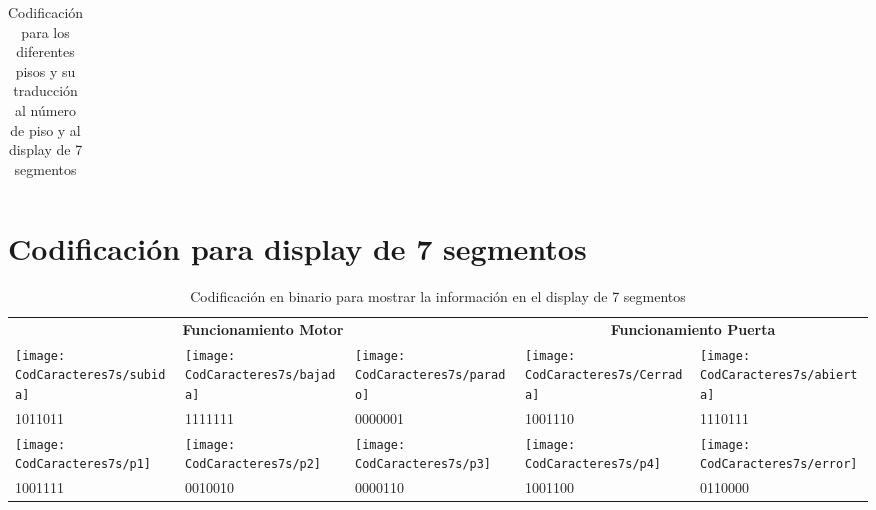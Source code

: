 \begin{appendices}
\begin{table}[H]
\begin{tabular}{|c|c|}
			\end{tabular}
			\caption{ Codificación para los diferentes pisos y su traducción  al número de piso y al display de 7 segmentos }
			\label{tab:tabla2ApendiceA}
		\end{table}
		
	\section{Codificación para display de 7 segmentos}	\label{app:7segmentos}
		\begin{table}[H]
        \centering
			\begin{tabular}{| p{1/4\textwidth}| p{}  | p{1/4\textwidth}|| p{}| p{}|}
				\hline
				\rowcolor[rgb]{0.21,0.69,0.87}\multicolumn{5}{|c|}{  \textbf{ {Caracteres en binario para display de 7 segmentos}}} \\
				\hline \hline
				\multicolumn{3}{|c|}{  \textbf{ {Funcionamiento Motor}}} & \multicolumn{2}{|c|}{\textbf{Funcionamiento Puerta}} \\
				\hline
				 \texttt{[image: CodCaracteres7s/subida]} &
				 \texttt{[image: CodCaracteres7s/bajada]}  &
				 \texttt{[image: CodCaracteres7s/parado]} &
				 \texttt{[image: CodCaracteres7s/Cerrada]}  &
				 \texttt{[image: CodCaracteres7s/abierta]}  \\
				 1011011 & 1111111 & 0000001 & 1001110 & 1110111 \\ 	
				\hline
				 \texttt{[image: CodCaracteres7s/p1]} &
				 \texttt{[image: CodCaracteres7s/p2]}  &
				 \texttt{[image: CodCaracteres7s/p3]} &
				 \texttt{[image: CodCaracteres7s/p4]}  &
				 \texttt{[image: CodCaracteres7s/error]}  \\
				 1001111 & 0010010 & 0000110 & 1001100 & 0110000 \\ 
				\hline
			\end{tabular}
			\caption{ Codificación en binario para mostrar la información en el display de 7 segmentos }
			\label{tab:tabla1ApendiceB}
		\end{table}
	\newpage	
\end{appendices}